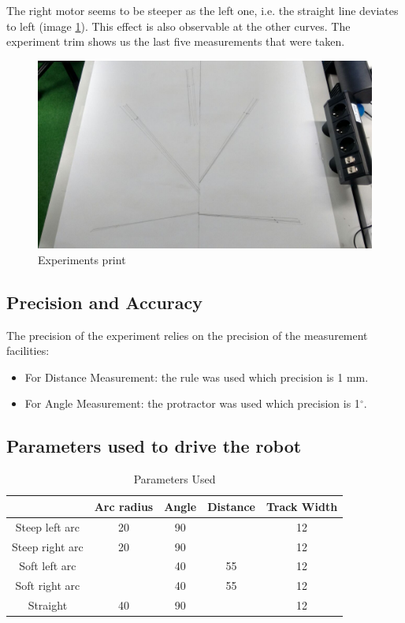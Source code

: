 \documentclass[10pt]{scrartcl}
\begin{document}
The right motor seems to be steeper as the left one, i.e. the straight line deviates to left (image \ref{fig:5}). This effect is also observable at the other curves. The experiment trim shows us the last five measurements that were taken.

\begin{figure}[h!]
\centering
\caption{Experiments print}
\label{fig:5}
\includegraphics[scale=0.3,trim={170 0 240 0},clip]{images/print}
\end{figure}

\subsection*{Precision and Accuracy}

The precision of the experiment relies on the precision of the measurement facilities:
\begin{itemize}
	\item For Distance Measurement: the rule was used which precision is 1 mm.
	\item For Angle Measurement: the protractor was used which precision is 1$^{\circ}$.
\end{itemize}

\newpage
\subsection*{Parameters used to drive the robot}

\begin{table}[ht!]
\centering
\caption{Parameters Used}
\label{tab:1}
\begin{tabular}{|c|c|c|c|c|} \hline
 				& Arc radius& Angle & Distance & Track Width \\ \hline
Steep left arc  & 20        & 90    &          & 12 \\ \hline
Steep right arc & 20        & 90    &          & 12 \\ \hline
Soft left arc   &           & 40    & 55       & 12 \\ \hline
Soft right arc  &           & 40    & 55       & 12 \\ \hline
Straight        & 40        & 90    &          & 12 \\ \hline
 
\end{tabular}
\end{table}
\end{document}
